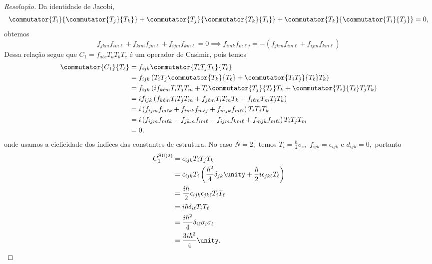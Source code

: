 \begin{proof}[Resolução]
    Da identidade de Jacobi,
    \begin{equation*}
        \commutator{T_i}{\commutator{T_j}{T_k}} +
        \commutator{T_j}{\commutator{T_k}{T_i}} +
        \commutator{T_k}{\commutator{T_i}{T_j}} = 0,
    \end{equation*}
    obtemos
    \begin{equation*}
        f_{jkm}f_{im \ell} + f_{kim}f_{j m \ell} + f_{ijm}f_{km \ell} = 0 \implies f_{imk} f_{m \ell j} = - \left(f_{jkm}f_{im \ell} + f_{ijm}f_{km \ell}\right)
    \end{equation*}
    Dessa relação segue que \(C_1 = f_{abc} T_a T_b T_c\) é um operador de Casimir, pois temos
    \begin{align*}
        \commutator{C_1}{T_\ell} &= f_{ijk} \commutator{T_i T_j T_k}{T_\ell}\\
                                 &= f_{ijk} \left(T_i T_j\commutator{T_k}{T_\ell} + \commutator{T_i T_j}{T_\ell} T_k\right)\\
                                 &= f_{ijk} \left(i f_{k\ell m} T_i T_j T_m + T_i \commutator{T_j}{T_{\ell}} T_k + \commutator{T_i}{T_\ell} T_j T_k\right)\\
                                 &= i f_{ijk}\left( f_{k\ell m} T_i T_j T_m + f_{j\ell m} T_i T_m T_k + f_{i \ell m} T_m T_j T_k\right)\\
                                 &= i \left(f_{ijm} f_{m\ell k} + f_{imk} f_{m\ell j} + f_{mjk} f_{m \ell i}\right)T_i T_j T_k\\
                                 &= i \left(f_{ijm} f_{m \ell k} - f_{jkm}f_{im \ell} - f_{ijm}f_{km \ell} + f_{mjk} f_{m\ell i}\right) T_i T_j T_m\\
                                 &= 0,
    \end{align*}
    onde usamos a ciclicidade dos índices das constantes de estrutura. No caso \(N = 2,\) temos \(T_i = \frac\hbar2 \sigma_i,\) \(f_{ijk} = \epsilon_{ijk}\) e \(d_{ijk} = 0,\) portanto
    \begin{align*}
        C_1^{\mathrm{SU}(2)} &= \epsilon_{ijk} T_i T_j T_k\\
                             &= \epsilon_{ijk} T_i \left(\frac{\hbar^2}{4} \delta_{jk} \unity + \frac{\hbar}{2} i\epsilon_{jk\ell} T_\ell\right)\\
                             &= \frac{i\hbar}{2}\epsilon_{ijk} \epsilon_{jk\ell} T_i T_\ell\\
                             &= i \hbar \delta_{i \ell} T_i T_\ell\\
                             &= \frac{i\hbar^2}{4} \delta_{i \ell} \sigma_i \sigma_\ell\\
                             &= \frac{3i \hbar^2}{4} \unity.
    \end{align*}


\end{proof}
